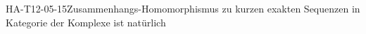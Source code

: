 
\begin{THEO}{HA-T12-05-15}{Zusammenhangs-Homomorphismus zu kurzen exakten Sequenzen in Kategorie der Komplexe ist natürlich}
\end{THEO}
